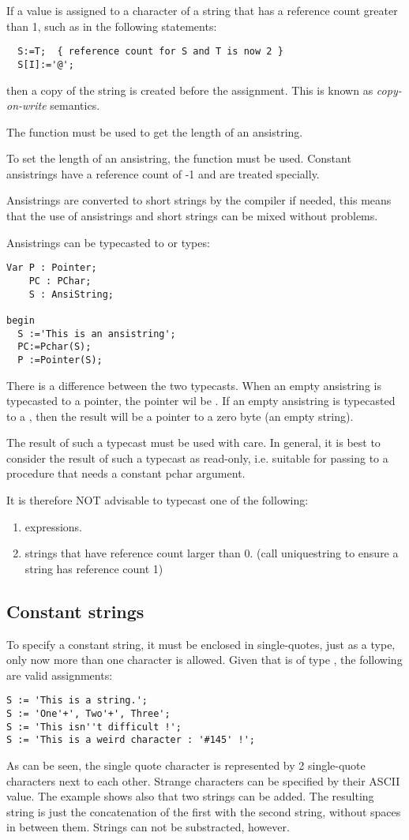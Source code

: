 If a value is assigned to a character of a string that has a reference count
greater than 1, such as in the following
statements:
\begin{verbatim}
  S:=T;  { reference count for S and T is now 2 }
  S[I]:='@';
\end{verbatim}
then a copy of the string is created before the assignment. This is known
as {\em copy-on-write} semantics.

The  function must be used to get the length of an
ansistring.

To set the length of an ansistring, the  function must be used.
Constant ansistrings have a reference count of -1 and are treated specially.

Ansistrings are converted to short strings by the compiler if needed,
this means that the use of ansistrings and short strings can be mixed
without problems.

Ansistrings can be typecasted to  or  types:
\begin{verbatim}
Var P : Pointer;
    PC : PChar;
    S : AnsiString;

begin
  S :='This is an ansistring';
  PC:=Pchar(S);
  P :=Pointer(S);
\end{verbatim}
There is a difference between the two typecasts. When an empty
ansistring is typecasted to a pointer, the pointer wil be . If an
empty ansistring is typecasted to a , then the result will be a pointer to a
zero byte (an empty string).

The result of such a typecast must be used with care. In general, it is best
to consider the result of such a typecast as read-only, i.e. suitable for
passing to a procedure that needs a constant pchar argument.

It is therefore NOT advisable to typecast one of the following:
\begin{enumerate}
\item expressions.
\item strings that have reference count larger than 0.
(call uniquestring to ensure a string has reference count 1)
\end{enumerate}
\subsection{Constant strings}

To specify a constant string, it must be enclosed in single-quotes, just
as a  type, only now more than one character is allowed.
Given that  is of type , the following are valid assignments:
\begin{verbatim}
S := 'This is a string.';
S := 'One'+', Two'+', Three';
S := 'This isn''t difficult !';
S := 'This is a weird character : '#145' !';
\end{verbatim}
As can be seen, the single quote character is represented by 2 single-quote
characters next to each other. Strange characters can be specified by their
ASCII value.
The example shows also that two strings can be added. The resulting string is
just the concatenation of the first with the second string, without spaces in
between them. Strings can not be substracted, however.

